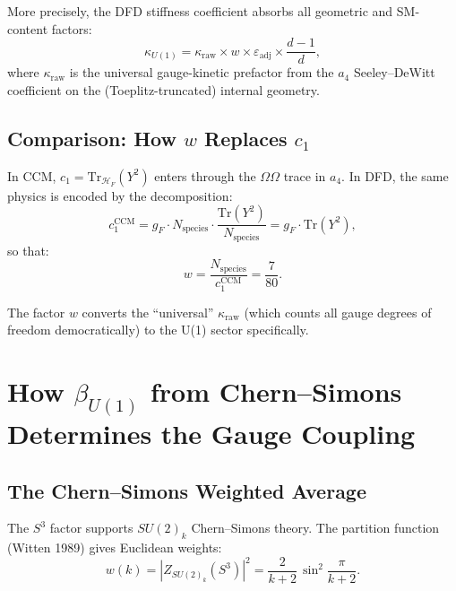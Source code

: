 \documentclass[12pt,a4paper]{article}
\begin{document}
More precisely, the DFD stiffness coefficient absorbs all geometric and
SM-content factors:
\begin{equation}\label{eq:kappa-formula}
\boxed{
\kappa_{U(1)} = \kappa_{\mathrm{raw}} \times w
\times \varepsilon_{\mathrm{adj}} \times \frac{d-1}{d},
}
\end{equation}
where $\kappa_{\mathrm{raw}}$ is the universal gauge-kinetic prefactor from
the $a_4$ Seeley--DeWitt coefficient on the (Toeplitz-truncated) internal
geometry.

\subsection{Comparison: How $w$ Replaces $c_1$}

In CCM, $c_1 = \mathrm{Tr}_{\mathcal{H}_F}(Y^2)$ enters through the
$\Omega\Omega$ trace in $a_4$.  In DFD, the same physics is encoded by
the decomposition:
\begin{equation}
c_1^{\mathrm{CCM}} = g_F \cdot N_{\mathrm{species}} \cdot
\frac{\mathrm{Tr}(Y^2)}{N_{\mathrm{species}}} = g_F \cdot \mathrm{Tr}(Y^2),
\end{equation}
so that:
\begin{equation}
w = \frac{N_{\mathrm{species}}}{c_1^{\mathrm{CCM}}} = \frac{7}{80}.
\end{equation}

The factor $w$ converts the ``universal'' $\kappa_{\mathrm{raw}}$ (which
counts all gauge degrees of freedom democratically) to the U(1) sector
specifically.

\section{How $\beta_{U(1)}$ from Chern--Simons Determines the Gauge Coupling}
\label{sec:beta-to-coupling}

\subsection{The Chern--Simons Weighted Average}

The $S^3$ factor supports $SU(2)_k$ Chern--Simons theory.  The partition
function (Witten 1989) gives Euclidean weights:
\begin{equation}\label{eq:cs-weight}
w(k) = |Z_{SU(2)_k}(S^3)|^2 = \frac{2}{k+2}\,\sin^2\!\frac{\pi}{k+2}.
\end{equation}
\end{document}
